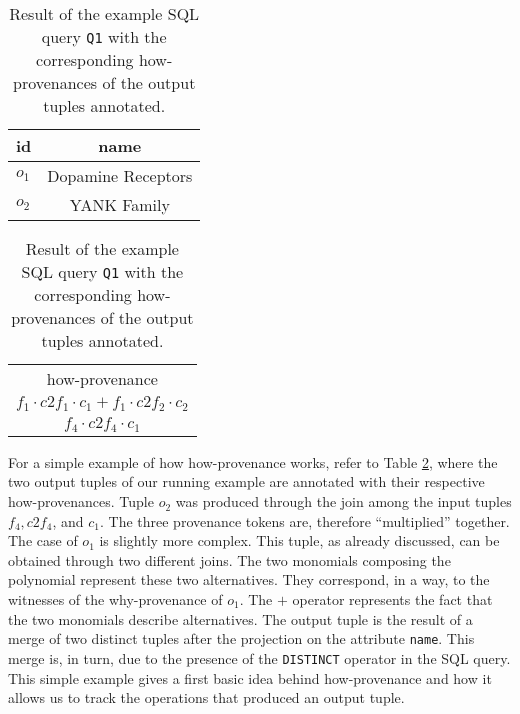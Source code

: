 \begin{table}[]
\centering
  \begin{tabular}{|l|c|}
  \hline
    id & name\\
    \hline
    $o_1$ &  Dopamine Receptors\\
    $o_2$ & YANK Family\\
    \hline
  \end{tabular}
  \begin{tabular}{c}
  	how-provenance   \\
  	$f_1 \cdot c2f_1 \cdot c_1 + f_1 \cdot c2f_2 \cdot c_2$ \\
  	$f_4 \cdot c2f_4 \cdot c_1$ \\
  \end{tabular}
    \caption{Result of the example SQL query \texttt{Q1} with the corresponding how-provenances of the output tuples annotated.}
  \label{table:result_how_prov}
\end{table} 

For a simple example of how how-provenance works, refer to Table \ref{table:result_how_prov}, where the two output tuples of our running example are annotated with their respective how-provenances. 
Tuple $o_2$ was produced through the join among the input tuples $f_4, c2f_4$, and $c_1$. The three provenance tokens are, therefore  ``multiplied'' together. 
The case of $o_1$ is slightly more complex. This tuple, as already discussed, can be obtained through two different joins. The two monomials composing the polynomial represent these two alternatives. They correspond, in a way, to the witnesses of the why-provenance of $o_1$.
The $+$ operator represents the fact that the two monomials describe alternatives. The output tuple is the result of a merge of two distinct tuples after the projection on the attribute \texttt{name}. This merge is, in turn, due to the presence of the \texttt{DISTINCT} operator in the SQL query. 
This simple example gives a first basic idea behind how-provenance and how it allows us to track the operations that produced an output tuple. 


